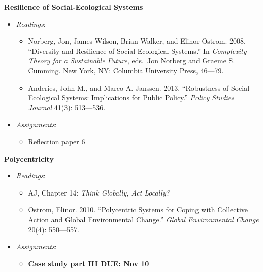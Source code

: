 \week \textbf{Resilience of Social-Ecological Systems}

\begin{itemize}

\item
  \emph{Readings}:

  \begin{itemize}
  
  \item
    Norberg, Jon, James Wilson, Brian Walker, and Elinor Ostrom. 2008.
    ``Diversity and Resilience of Social-Ecological Systems.'' In
    \emph{Complexity Theory for a Sustainable Future}, eds.~Jon Norberg
    and Graeme S. Cumming. New York, NY: Columbia University Press,
    46---79.
  \item
    Anderies, John M., and Marco A. Janssen. 2013. ``Robustness of
    Social-Ecological Systems: Implications for Public Policy.''
    \emph{Policy Studies Journal} 41(3): 513---536.
  \end{itemize}
\item
  \emph{Assignments}:

  \begin{itemize}
  
  \item
    Reflection paper 6
  \end{itemize}
\end{itemize}

\week \textbf{Polycentricity}

\begin{itemize}

\item
  \emph{Readings}:

  \begin{itemize}
  
  \item
    AJ, Chapter 14: \emph{Think Globally, Act Locally?}
  \item
    Ostrom, Elinor. 2010. ``Polycentric Systems for Coping with
    Collective Action and Global Environmental Change.'' \emph{Global
    Environmental Change} 20(4): 550---557.
  \end{itemize}
\item
  \emph{Assignments}:

  \begin{itemize}
  
  \item
    \textbf{Case study part III DUE: Nov 10}
  \end{itemize}
\end{itemize}

